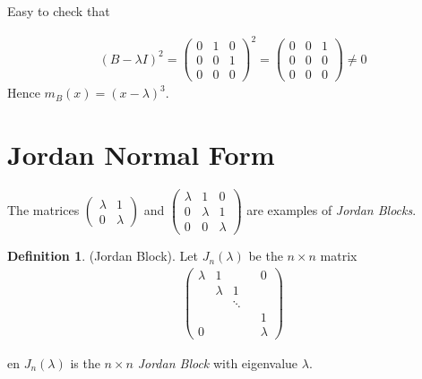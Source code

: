 \documentclass{article}
\theoremstyle{definition} \newtheorem*{definition}{Definition}
\begin{document}
\begin{exmps}
\begin{enumerate}[(i)]
      Easy to check that

      \begin{align*}
        (B-\lambda I)^2 = \left( 
        \begin{matrix}
           0 & 1 & 0\\
           0 & 0 & 1\\
           0 & 0 & 0
        \end{matrix}
        \right)^2 = \left( 
        \begin{matrix}
          0 & 0 & 1 \\
          0 & 0 & 0\\
          0 & 0 & 0
        \end{matrix}
        \right) \neq 0
      \end{align*}
      Hence $m_B(x)=(x-\lambda)^3$.
  \end{enumerate}

\end{exmps}


\section{Jordan Normal Form}
The matrices $\left( 
\begin{matrix}
  \lambda & 1\\
  0 &\lambda
\end{matrix}
\right)$ and $\left( 
\begin{matrix}
  \lambda & 1 & 0\\
  0 &\lambda & 1\\
  0 & 0 & \lambda
\end{matrix}
\right)$ are examples of \textit{Jordan Blocks}.
\begin{definition}
  (Jordan Block). Let $J_n(\lambda)$ be the $n\times n$ matrix
  \begin{align*}
    \left( 
    \begin{matrix}
      \lambda & 1       &        & & 0   \\
              & \lambda &      1 & &     \\
              &         & \ddots & &     \\
              &         &        & & 1   \\
       0      &         &        & & \lambda
    \end{matrix}
    \right)
  \end{align*}

  en $J_n(\lambda)$ is the $n\times n$ \textit{Jordan Block} with 
  eigenvalue $\lambda$.
\end{definition}
\end{document}
